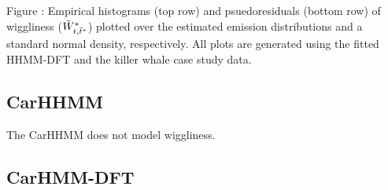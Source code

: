 \documentclass{article}
\begin{document}
        \noindent Figure : Empirical histograms (top row) and psuedoresiduals (bottom row) of wiggliness ($\tilde{W}^*_{t,\tilde t^*}$) plotted over the estimated emission distributions and a standard normal density, respectively. All plots are generated using the fitted HHMM-DFT and the killer whale case study data.
        \addtocounter{fignum}{1}
        
        \subsection{CarHHMM}
        
        The CarHHMM does not model wiggliness.
        
        \subsection{CarHMM-DFT}
        
\end{document}

